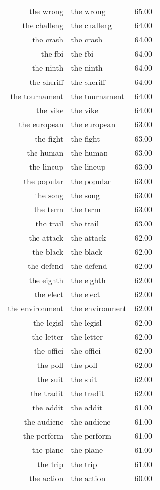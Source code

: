 \begin{table}[ht]
\begin{tabular}{rlr}
  the wrong & the wrong & 65.00 \\ 
  the challeng & the challeng & 64.00 \\ 
  the crash & the crash & 64.00 \\ 
  the fbi & the fbi & 64.00 \\ 
  the ninth & the ninth & 64.00 \\ 
  the sheriff & the sheriff & 64.00 \\ 
  the tournament & the tournament & 64.00 \\ 
  the vike & the vike & 64.00 \\ 
  the european & the european & 63.00 \\ 
  the fight & the fight & 63.00 \\ 
  the human & the human & 63.00 \\ 
  the lineup & the lineup & 63.00 \\ 
  the popular & the popular & 63.00 \\ 
  the song & the song & 63.00 \\ 
  the term & the term & 63.00 \\ 
  the trail & the trail & 63.00 \\ 
  the attack & the attack & 62.00 \\ 
  the black & the black & 62.00 \\ 
  the defend & the defend & 62.00 \\ 
  the eighth & the eighth & 62.00 \\ 
  the elect & the elect & 62.00 \\ 
  the environment & the environment & 62.00 \\ 
  the legisl & the legisl & 62.00 \\ 
  the letter & the letter & 62.00 \\ 
  the offici & the offici & 62.00 \\ 
  the poll & the poll & 62.00 \\ 
  the suit & the suit & 62.00 \\ 
  the tradit & the tradit & 62.00 \\ 
  the addit & the addit & 61.00 \\ 
  the audienc & the audienc & 61.00 \\ 
  the perform & the perform & 61.00 \\ 
  the plane & the plane & 61.00 \\ 
  the trip & the trip & 61.00 \\ 
  the action & the action & 60.00 \\ 

\end{tabular}
\end{table}
